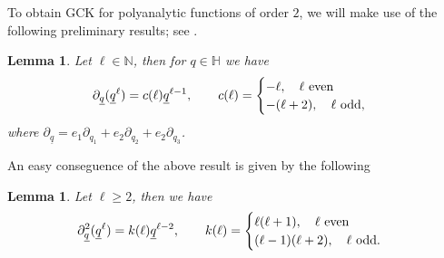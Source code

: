 \documentclass[reqno,11pt]{amsart}
\numberwithin{equation}{section}
\newtheorem{lemma}[theorem]{Lemma}
\theoremstyle{definition}
\begin{document}
To obtain GCK for polyanalytic functions of order $2$, we will make use of the following preliminary results; see \cite{red, green}.


\begin{lemma}
	Let $ \ell  \in \mathbb{N}$, then for $q \in \mathbb{H}$ we have
	\begin{equation}
		\label{f1}
		\partial_{\underline{q}}(\underline{q}^\ell)= c(\ell) \underline{q}^{\ell-1}, \qquad c(\ell)=\begin{cases}
			- \ell, \quad \ell \, \, \hbox{even}\\
			-(\ell+2), \quad \ell \, \, \hbox{odd},
		\end{cases}
	\end{equation}
where $\partial_{\underline{q}}= e_1 \partial_{q_1}+e_2 \partial_{q_2}+e_2 \partial_{q_3}$.
\end{lemma}

An easy conseguence of the above result is given by the following

\begin{lemma}
	Let $\ell \geq 2$,  then we have
	\begin{equation}
		\label{f2}
		\partial_{\underline{q}}^2(\underline{q}^\ell)=k(\ell) \underline{q}^{\ell-2}, \qquad k(\ell)=\begin{cases}
			\ell (\ell+1) , \quad \ell \, \, \hbox{even}\\
			(\ell-1)(\ell+2)	, \quad \ell \, \, \hbox{odd}.
		\end{cases}
	\end{equation}
\end{lemma}
\end{document}
